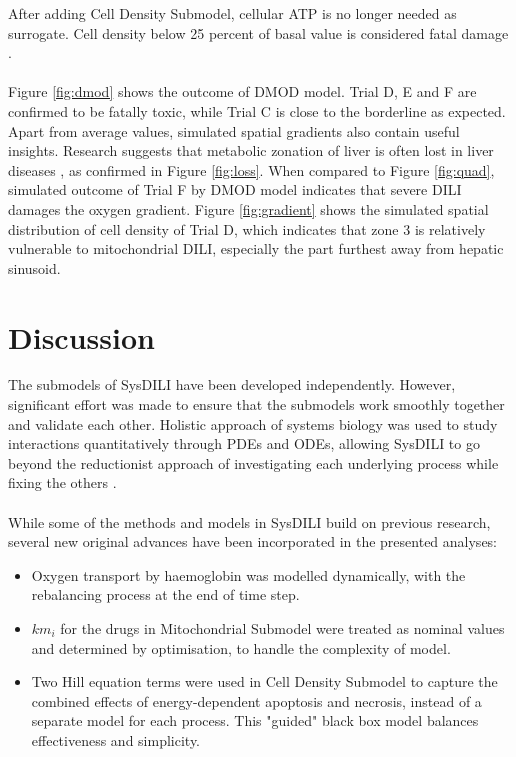 \documentclass[12pt]{article}
\begin{document}
After adding Cell Density Submodel, cellular ATP is no longer needed as surrogate. Cell density below 25 percent of basal value is considered fatal damage \cite{furchtgottModelLiverRegeneration2009}.\\\\
Figure \ref{fig:dmod} shows the outcome of DMOD model. Trial D, E and F are confirmed to be fatally toxic, while Trial C is close to the borderline as expected. Apart from average values, simulated spatial gradients also contain useful insights. Research suggests that metabolic zonation of liver is often lost in liver diseases \cite{kietzmannMetabolicZonationLiver2017a}, as confirmed in Figure \ref{fig:loss}. When compared to Figure \ref{fig:quad}, simulated outcome of Trial F by DMOD model indicates that severe DILI damages the oxygen gradient. Figure \ref{fig:gradient} shows the simulated spatial distribution of cell density of Trial D, which indicates that zone 3 is relatively vulnerable to mitochondrial DILI, especially the part furthest away from hepatic sinusoid.
\section{Discussion}
The submodels of SysDILI have been developed independently. However, significant effort was made to ensure that the submodels
work smoothly together and validate each other. Holistic approach of systems biology was used to study interactions quantitatively through PDEs and ODEs, allowing SysDILI to go beyond the reductionist approach of investigating each underlying process while fixing the others \cite{tavassolySystemsBiologyPrimer2018}. \\\\
While some of the methods and models in SysDILI build on previous research, several new original advances have been incorporated in the presented analyses:
\begin{itemize}
    \item Oxygen transport by haemoglobin was modelled dynamically, with the rebalancing process at the end of time step.
    \item {$km_i$} for the drugs in Mitochondrial Submodel were treated as nominal values and determined by optimisation, to handle the complexity of model.
    \item Two Hill equation terms were used in Cell Density Submodel to capture the combined effects of energy-dependent apoptosis and necrosis, instead of a separate model for each process. This "guided" black box model balances effectiveness and simplicity.
\end{itemize}
\end{document}
